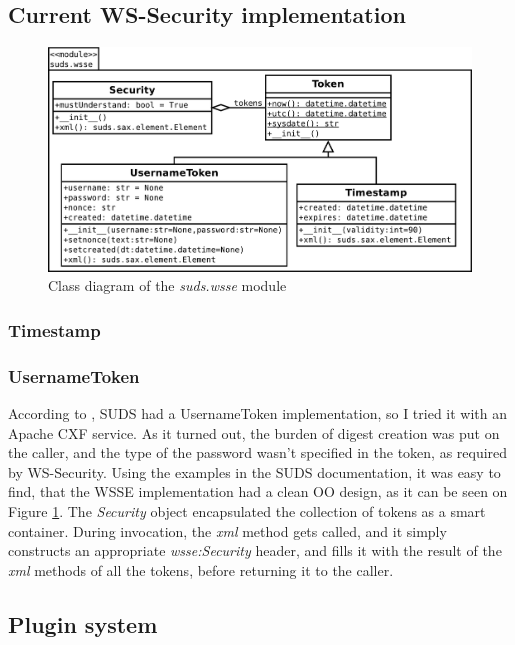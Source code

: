 \subsection{Current WS-Security implementation}

\begin{figure}[htbp]
 \centering
 \includegraphics[width=12cm]{images/clsdSudsWsse.pdf}
 \caption{Class diagram of the \emph{suds.wsse} module}
 \label{fig:clsdSudsWsse}
\end{figure}

\subsubsection{Timestamp}


\subsubsection{UsernameToken}
\label{sudsUsernameToken}

According to \cite{suds-doc}, SUDS had a UsernameToken implementation, so I tried it with an Apache CXF service. As it turned out, the burden of digest creation was put on the caller, and the type of the password wasn't specified in the token, as required by WS\hyp{}Security. Using the examples in the SUDS documentation, it was easy to find, that the WSSE implementation had a clean OO design, as it can be seen on Figure \ref{fig:clsdSudsWsse}. The \emph{Security} object encapsulated the collection of tokens as a smart container. During invocation, the \emph{xml} method gets called, and it simply constructs an appropriate \emph{wsse:Security} header, and fills it with the result of the \emph{xml} methods of all the tokens, before returning it to the caller.

\subsection{Plugin system}
\label{sudsPlugins}

